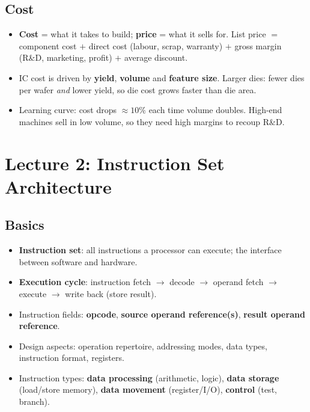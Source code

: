 \documentclass[11pt]{article}
\begin{document}
\subsection{Cost}
\begin{itemize}[leftmargin=*]
  \item \textbf{Cost} = what it takes to build; \textbf{price} = what it
  sells for. List price $=$ component cost $+$ direct cost (labour, scrap,
  warranty) $+$ gross margin (R\&D, marketing, profit) $+$ average discount.
  \item IC cost is driven by \textbf{yield}, \textbf{volume} and
  \textbf{feature size}. Larger dies: fewer dies per wafer \emph{and} lower
  yield, so die cost grows faster than die area.
  \item Learning curve: cost drops $\approx10\%$ each time volume doubles.
  High-end machines sell in low volume, so they need high margins to recoup
  R\&D.
\end{itemize}

\section{Lecture 2: Instruction Set Architecture}

\subsection{Basics}
\begin{itemize}[leftmargin=*]
  \item \textbf{Instruction set}: all instructions a processor can execute;
  the interface between software and hardware.
  \item \textbf{Execution cycle}: instruction fetch $\to$ decode $\to$
  operand fetch $\to$ execute $\to$ write back (store result).
  \item Instruction fields: \textbf{opcode}, \textbf{source operand
  reference(s)}, \textbf{result operand reference}.
  \item Design aspects: operation repertoire, addressing modes, data types,
  instruction format, registers.
  \item Instruction types: \textbf{data processing} (arithmetic, logic),
  \textbf{data storage} (load/store memory), \textbf{data movement}
  (register/I/O), \textbf{control} (test, branch).
\end{itemize}
\end{document}
